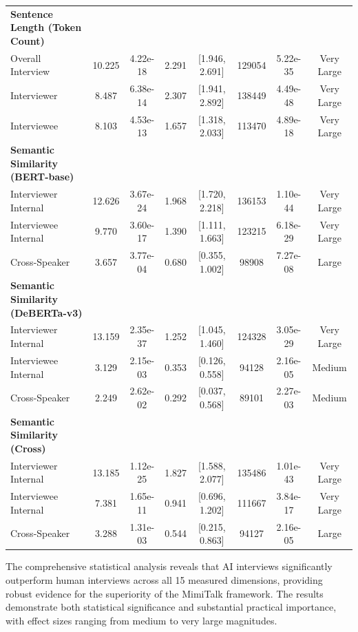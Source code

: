\documentclass[sigchi,nonacm,manuscript]{acmart}
\begin{document}
\begin{table}[t]
\begin{tabular}{@{\hspace{0.2em}}l@{\hspace{0.6em}}c@{\hspace{0.5em}}c@{\hspace{0.5em}}c@{\hspace{0.5em}}c@{\hspace{0.5em}}c@{\hspace{0.5em}}c@{\hspace{0.5em}}c@{\hspace{0.2em}}}
\textbf{Sentence Length (Token Count)} & & & & & & & \\
\quad Overall Interview & 10.225 & 4.22e-18 & 2.291 & [1.946, 2.691] & 129054 & 5.22e-35 & Very Large \\
\quad Interviewer & 8.487 & 6.38e-14 & 2.307 & [1.941, 2.892] & 138449 & 4.49e-48 & Very Large \\
\quad Interviewee & 8.103 & 4.53e-13 & 1.657 & [1.318, 2.033] & 113470 & 4.89e-18 & Very Large \\[0.4em]
\textbf{Semantic Similarity (BERT-base)} & & & & & & & \\
\quad Interviewer Internal & 12.626 & 3.67e-24 & 1.968 & [1.720, 2.218] & 136153 & 1.10e-44 & Very Large \\
\quad Interviewee Internal & 9.770 & 3.60e-17 & 1.390 & [1.111, 1.663] & 123215 & 6.18e-29 & Very Large \\
\quad Cross-Speaker & 3.657 & 3.77e-04 & 0.680 & [0.355, 1.002] & 98908 & 7.27e-08 & Large \\[0.4em]
\textbf{Semantic Similarity (DeBERTa-v3)} & & & & & & & \\
\quad Interviewer Internal & 13.159 & 2.35e-37 & 1.252 & [1.045, 1.460] & 124328 & 3.05e-29 & Very Large \\
\quad Interviewee Internal & 3.129 & 2.15e-03 & 0.353 & [0.126, 0.558] & 94128 & 2.16e-05 & Medium \\
\quad Cross-Speaker & 2.249 & 2.62e-02 & 0.292 & [0.037, 0.568] & 89101 & 2.27e-03 & Medium \\[0.4em]
\textbf{Semantic Similarity (Cross)} & & & & & & & \\
\quad Interviewer Internal & 13.185 & 1.12e-25 & 1.827 & [1.588, 2.077] & 135486 & 1.01e-43 & Very Large \\
\quad Interviewee Internal & 7.381 & 1.65e-11 & 0.941 & [0.696, 1.202] & 111667 & 3.84e-17 & Very Large \\
\quad Cross-Speaker & 3.288 & 1.31e-03 & 0.544 & [0.215, 0.863] & 94127 & 2.16e-05 & Large \\
    \bottomrule
  \end{tabular}
\end{table}

The comprehensive statistical analysis reveals that AI interviews significantly outperform human interviews across all 15 measured dimensions, providing robust evidence for the superiority of the MimiTalk framework. The results demonstrate both statistical significance and substantial practical importance, with effect sizes ranging from medium to very large magnitudes.
\end{document}
